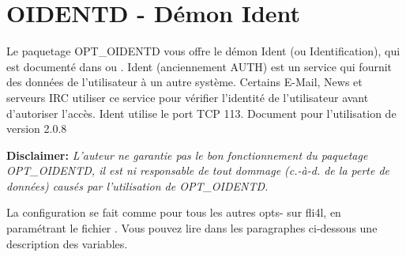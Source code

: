 \section {OIDENTD - Démon Ident}

Le paquetage OPT\_OIDENTD vous offre le démon Ident (ou Identification), qui est
documenté dans  ou .
Ident (anciennement AUTH) est un service qui fournit des données de l'utilisateur
à un autre système. Certains \mbox{E-Mail}, News et serveurs IRC utiliser ce
service pour vérifier l'identité de l'utilisateur avant d'autoriser l'accès.
Ident utilise le port TCP 113. Document pour l'utilisation de 
version 2.0.8


\textbf{Disclaimer: }\emph{L'auteur ne garantie pas le bon fonctionnement
du paquetage OPT\_\-OIDENTD, il est ni responsable de tout dommage
(c.-à-d. de la perte de données) causés par l'utilisation de OPT\_\-OIDENTD.}



La configuration se fait comme pour tous les autres opts- sur fli4l, en paramétrant
le fichier . Vous pouvez lire dans
les paragraphes ci-dessous une description des variables.


